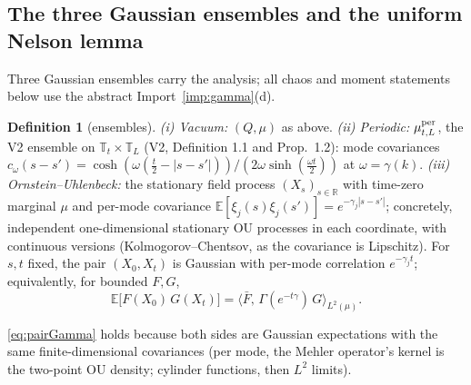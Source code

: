 \documentclass[11pt,a4paper]{article}
\theoremstyle{plain}
\theoremstyle{definition}
\newtheorem{definition}[theorem]{Definition}
\newcommand{\R}{\mathbb{R}}
\newcommand{\T}{\mathbb{T}}
\newcommand{\E}{\mathbb{E}}
\newcommand{\ip}[2]{\langle #1,#2\rangle}
\DeclareMathOperator{\sh}{sinh}
\newcommand{\ch}{\cosh}
\newcommand{\muv}{\mu}
\newcommand{\Gam}{\Gamma}
\begin{document}
\subsection{The three Gaussian ensembles and the uniform Nelson lemma}

Three Gaussian ensembles carry the analysis; all chaos and moment
statements below use the abstract Import~\ref{imp:gamma}(d).

\begin{definition}[ensembles]\label{def:ensembles}
\emph{(i) Vacuum:} $(Q,\muv)$ as above.
\emph{(ii) Periodic:} $\mu^{\rm per}_{t,L}$, the V2 ensemble on
$\T_t\times\T_L$ (V2, Definition 1.1 and Prop.\ 1.2): mode covariances
$c_\omega(s-s')=\ch(\omega(\tfrac t2-|s-s'|))/(2\omega\sh(\tfrac{\omega
t}2))$ at $\omega=\gamma(k)$.
\emph{(iii) Ornstein--Uhlenbeck:} the stationary field process
$(X_s)_{s\in\R}$ with time-zero marginal $\muv$ and per-mode covariance
$\E[\xi_j(s)\xi_j(s')]=e^{-\gamma_j|s-s'|}$; concretely, independent
one-dimensional stationary OU processes in each coordinate, with
continuous versions (Kolmogorov--Chentsov, as the covariance is
Lipschitz). For $s,t$ fixed, the pair $(X_0,X_t)$ is Gaussian with
per-mode correlation $e^{-\gamma_jt}$; equivalently, for bounded
$F,G$,
\begin{equation}
 \E\bigl[F(X_0)\,G(X_t)\bigr]
 =\ip{\bar F}{\,\Gam(e^{-t\gamma})\,G}_{L^2(\muv)} .
 \label{eq:pairGamma}
\end{equation}
\end{definition}

\eqref{eq:pairGamma} holds because both sides are Gaussian expectations
with the same finite-dimensional covariances (per mode, the Mehler
operator's kernel is the two-point OU density; cylinder functions, then
$L^2$ limits).
\end{document}
